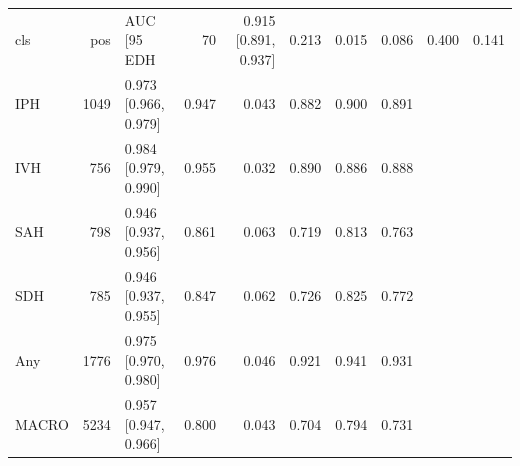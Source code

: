 \begin{tabular}{lrlrrrrr}
\toprule
cls & pos & AUC [95%
\midrule
EDH & 70 & 0.915 [0.891, 0.937] & 0.213 & 0.015 & 0.086 & 0.400 & 0.141 \\
IPH & 1049 & 0.973 [0.966, 0.979] & 0.947 & 0.043 & 0.882 & 0.900 & 0.891 \\
IVH & 756 & 0.984 [0.979, 0.990] & 0.955 & 0.032 & 0.890 & 0.886 & 0.888 \\
SAH & 798 & 0.946 [0.937, 0.956] & 0.861 & 0.063 & 0.719 & 0.813 & 0.763 \\
SDH & 785 & 0.946 [0.937, 0.955] & 0.847 & 0.062 & 0.726 & 0.825 & 0.772 \\
Any & 1776 & 0.975 [0.970, 0.980] & 0.976 & 0.046 & 0.921 & 0.941 & 0.931 \\
MACRO & 5234 & 0.957 [0.947, 0.966] & 0.800 & 0.043 & 0.704 & 0.794 & 0.731 \\
\bottomrule
\end{tabular}
